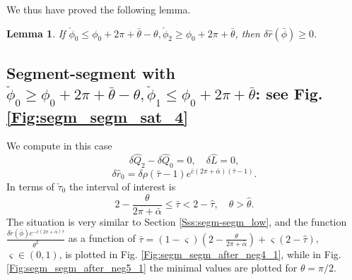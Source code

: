 \documentclass[reqno]{amsart}
\theoremstyle{definition} \newtheorem{definition}{Definition}[section]
\theoremstyle{definition} \newtheorem{remark}[definition]{Remark}
\theoremstyle{plain} \newtheorem{lemma}[definition]{Lemma}
\theoremstyle{plain} \newtheorem{proposition}[definition]{Proposition}
\theoremstyle{plain} \newtheorem{theorem}[definition]{Theorem}
\theoremstyle{plain} \newtheorem{corollary}[definition]{Corollary}
\theoremstyle{definition} \newtheorem{example}[definition]{Example}
\theoremstyle{plain} \newtheorem{claim}[clai]{Claim}
\theoremstyle{definition} \newtheorem{assumption}[definition]{Assumption}
\theoremstyle{definition} \newtheorem{observation}[definition]{Observation}
\newcommand{\1}{\mathbbm 1}
\numberwithin{equation}{section} %
\theoremstyle{plain} \newtheorem*{theorem*}{Theorem}
\theoremstyle{plain} \newtheorem{mthm}[maintheorem]{Main Theorem}
\theoremstyle{plain} \newtheorem*{mthm*}{Main Theorem}
\theoremstyle{plain} \newtheorem*{conjecture*}{Conjecture}
\theoremstyle{plain} \newtheorem{conjecture}[definition]{Conjecture}
\theoremstyle{plain} \newtheorem*{problem*}{Problem}
\begin{document}
We thus have proved the following lemma.

\begin{lemma}
\label{Lem:segm_tent_2}
If $\check \phi_0 \leq \phi_0 + 2\pi + \bar \theta - \theta, \check \phi_2 \geq \phi_0 + 2\pi + \bar \theta$, then $\delta \hat r(\bar \phi) \geq 0$.
\end{lemma}

%
%
%
%



\subsection{Segment-segment with \texorpdfstring{$\check \phi_0 \geq \phi_0 + 2\pi + \bar \theta - \theta, \check \phi_1 \leq \phi_0 + 2\pi + \bar \theta$}{check phi0 geq phi0 + 2pi + bar theta - theta, check phi1 leq phi0 + 2pi + bar theta}: see Fig. \ref{Fig:segm_segm_sat_4}}
\label{Sss:segm_semg_after_neg_4}


We compute in this case
\begin{equation*}
\delta \hat Q_2 - \delta \hat Q_0 = 0, \quad \delta \hat L = 0,
\end{equation*}
\begin{equation*}
\delta \hat r_0 = \delta \rho(\bar \tau - 1) e^{\bar c (2\pi + \bar \alpha) (\bar \tau - 1)}.
\end{equation*}
In terms of $\check \tau_0$ the interval of interest is
\begin{equation*}
2 - \frac{\theta}{2\pi + \bar \alpha} \leq \bar \tau < 2 - \hat \tau, \quad \theta > \hat \theta.
\end{equation*}
The situation is very similar to Section \ref{Sss:segm-segm_low}, and the function $\frac{\delta \check r(\bar \phi) e^{-\bar c(2\pi + \bar \alpha) \bar \tau}}{\theta^2}$ as a function of $\bar \tau = (1-\varsigma) (2 - \frac{\theta}{2\pi + \bar \alpha}) + \varsigma (2 - \hat \tau)$, $\varsigma \in (0,1)$, is plotted in Fig. \ref{Fig:segm_segm_after_neg4_1}, while in Fig. \ref{Fig:segm_segm_after_neg5_1} the minimal values are plotted for $\theta = \pi/2$.
\end{document}
